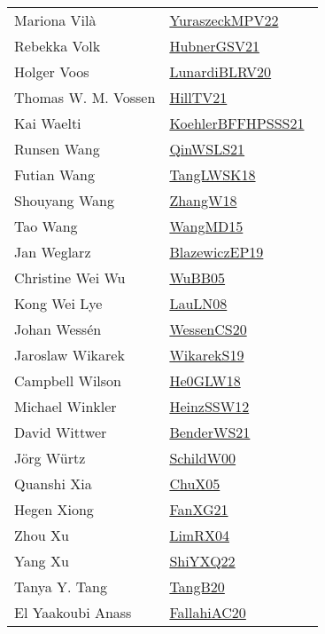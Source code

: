 {\begin{longtable}{p{4cm}p{20cm}}
Mariona Vil{\`a} & \href{works/YuraszeckMPV22.pdf}{YuraszeckMPV22}~\cite{YuraszeckMPV22}\\
Rebekka Volk & \href{works/HubnerGSV21.pdf}{HubnerGSV21}~\cite{HubnerGSV21}\\
Holger Voos & \href{works/LunardiBLRV20.pdf}{LunardiBLRV20}~\cite{LunardiBLRV20}\\
Thomas W. M. Vossen & \href{works/HillTV21.pdf}{HillTV21}~\cite{HillTV21}\\
Kai Waelti & \href{works/KoehlerBFFHPSSS21.pdf}{KoehlerBFFHPSSS21}~\cite{KoehlerBFFHPSSS21}\\
Runsen Wang & \href{works/QinWSLS21.pdf}{QinWSLS21}~\cite{QinWSLS21}\\
Futian Wang & \href{works/TangLWSK18.pdf}{TangLWSK18}~\cite{TangLWSK18}\\
Shouyang Wang & \href{works/ZhangW18.pdf}{ZhangW18}~\cite{ZhangW18}\\
Tao Wang & \href{works/WangMD15.pdf}{WangMD15}~\cite{WangMD15}\\
Jan Weglarz & \href{}{BlazewiczEP19}~\cite{BlazewiczEP19}\\
Christine Wei Wu & \href{works/WuBB05.pdf}{WuBB05}~\cite{WuBB05}\\
Kong Wei Lye & \href{works/LauLN08.pdf}{LauLN08}~\cite{LauLN08}\\
Johan Wess{\'{e}}n & \href{works/WessenCS20.pdf}{WessenCS20}~\cite{WessenCS20}\\
Jaroslaw Wikarek & \href{works/WikarekS19.pdf}{WikarekS19}~\cite{WikarekS19}\\
Campbell Wilson & \href{works/He0GLW18.pdf}{He0GLW18}~\cite{He0GLW18}\\
Michael Winkler & \href{works/HeinzSSW12.pdf}{HeinzSSW12}~\cite{HeinzSSW12}\\
David Wittwer & \href{works/BenderWS21.pdf}{BenderWS21}~\cite{BenderWS21}\\
J{\"{o}}rg W{\"{u}}rtz & \href{works/SchildW00.pdf}{SchildW00}~\cite{SchildW00}\\
Quanshi Xia & \href{works/ChuX05.pdf}{ChuX05}~\cite{ChuX05}\\
Hegen Xiong & \href{works/FanXG21.pdf}{FanXG21}~\cite{FanXG21}\\
Zhou Xu & \href{works/LimRX04.pdf}{LimRX04}~\cite{LimRX04}\\
Yang Xu & \href{}{ShiYXQ22}~\cite{ShiYXQ22}\\
Tanya Y. Tang & \href{works/TangB20.pdf}{TangB20}~\cite{TangB20}\\
El Yaakoubi Anass & \href{works/FallahiAC20.pdf}{FallahiAC20}~\cite{FallahiAC20}\\

\end{longtable}}
